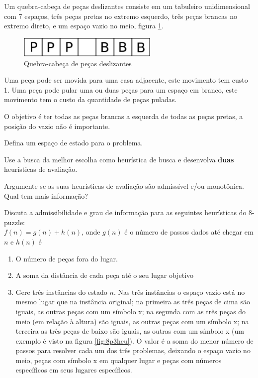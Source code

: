 \documentclass[12pt]{exam}
\begin{document}
\break

\begin{questions}


\question Um quebra-cabeça de peças deslizantes consiste em um tabuleiro unidimensional com 7 espaços, três peças pretas no extremo esquerdo, três peças brancas no extremo direto, e um espaço vazio no meio, figura \ref{fig:bp}.

\begin{figure}[h]
    \centering
    \includegraphics[width=0.60\textwidth]{bp}
    \caption{Quebra-cabeça de peças deslizantes}
    \label{fig:bp}
\end{figure}

Uma peça pode ser movida para uma casa adjacente, este movimento tem custo 1. Uma peça pode pular uma ou duas peças para um espaço em branco, este movimento tem o custo da quantidade de peças puladas.

O objetivo é ter todas as peças brancas a esquerda de todas as peças pretas, a posição do vazio não é importante.

Defina um espaço de estado para o problema.

Use a busca da melhor escolha como heurística de busca e desenvolva \textbf{duas} heurísticas de avaliação.

Argumente se as suas heurísticas de avaliação são admissível e/ou monotônica. Qual tem mais informação?

\break

\question Discuta a admissibilidade
e grau de informação para as seguintes heurísticas do 8-puzzle:\\
$f(n) = g(n)+h(n)$, onde $g(n)$ é o número de passos dados até chegar em $n$ e $h(n)$ é

\begin{enumerate}
\item O número de peças fora do lugar.
\item A soma da distância de cada peça até o seu lugar objetivo
\item Gere três instâncias do estado $n$. Nas três instâncias o espaço vazio está no mesmo lugar que na instância original; na primeira as três peças de cima são iguais, as outras peças com um símbolo x; na segunda com as três peças do meio (em relação à altura) são iguais, as outras peças com um símbolo x; na terceira as três peças de baixo são iguais, as outras com um símbolo x (um exemplo é visto na figura \ref{fig:8p3heu}). O valor é a soma do menor número de passos para resolver cada um dos três problemas, deixando o espaço vazio no meio, peças com símbolo x em qualquer lugar e peças com números específicos em seus lugares específicos.
\end{enumerate}


\end{questions}
\end{document}
